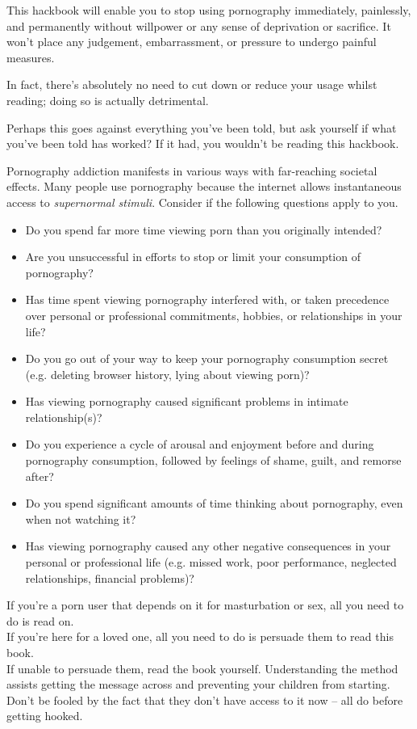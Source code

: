 \documentclass[easypeasy.tex]{subfiles}
\begin{document}
This hackbook will enable you to stop using pornography immediately, painlessly, and permanently without willpower or any sense of deprivation or sacrifice. It won't place any judgement, embarrassment, or pressure to undergo painful measures.

In fact, there's absolutely no need to cut down or reduce your usage whilst reading; doing so is actually detrimental. 

Perhaps this goes against everything you've been told, but ask yourself if what you've been told has worked? If it had, you wouldn't be reading this hackbook.

Pornography addiction manifests in various ways with far-reaching societal effects. Many people use pornography because the internet allows instantaneous access to \textit{supernormal stimuli}. Consider if the following questions apply to you.

\begin{itemize}
  \item Do you spend far more time viewing porn than you originally intended?
  \item Are you unsuccessful in efforts to stop or limit your consumption of pornography?
  \item Has time spent viewing pornography interfered with, or taken precedence over personal or professional commitments, hobbies, or relationships in your life?
  \item Do you go out of your way to keep your pornography consumption secret (e.g. deleting browser history, lying about viewing porn)?
  \item Has viewing pornography caused significant problems in intimate relationship(s)?
  \item Do you experience a cycle of arousal and enjoyment before and during pornography consumption, followed by feelings of shame, guilt, and remorse after?
  \item Do you spend significant amounts of time thinking about pornography, even when not watching it?
  \item Has viewing pornography caused any other negative consequences in your personal or professional life (e.g. missed work, poor performance, neglected relationships, financial problems)?
\end{itemize}

If you're a porn user that depends on it for masturbation or sex, all you need to do is read on. \\
If you're here for a loved one, all you need to do is persuade them to read this book. \\
If unable to persuade them, read the book yourself. Understanding the method assists getting the message across and preventing your children from starting. Don't be fooled by the fact that they don't have access to it now -- all do before getting hooked.
\end{document}
